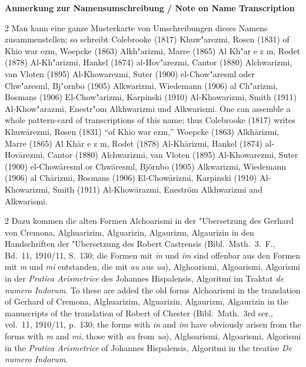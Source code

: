 \documentclass[10pt,a4paper]{article}
\renewcommand{\switchcolumn}{\syncronize\nointerlineskip\columnbreak}
\begin{document}
\vspace{0.8em}
\textbf{Anmerkung zur Namensumschreibung / Note on Name Transcription}

\begin{paracol}{2}
Man kann eine ganze Musterkarte von Umschreibungen dieses Namens zusammenstellen; so schreibt Colebrooke (1817) Khuw"arezmi, Rosen (1831) of Khio war ezm, Woepcke (1863) Alkh"arizmi, Marre (1865) Al Kh"ar e z m, Rodet (1878) Al-Kh"arizmi, Hankel (1874) al-Hov"arezmi, Cantor (1880) Alchwarizmi, van Vloten (1895) Al-Khowarezmi, Suter (1900) el-Chow"aresml oder Chw"aresml, Bj"ornbo (1905) Alkwarizmi, Wiedemann (1906) al Ch"arizmi, Bosmans (1906) El-Chow"arizmi, Karpinski (1910) Al-Khowarizmi, Smith (1911) Al-Khow"arazmi, Enestr"om Alkhwarizmi und Alkwarismi.
\switchcolumn
One can assemble a whole pattern-card of transcriptions of this name; thus Colebrooke (1817) writes Khuw\=arezmi, Rosen (1831) ``of Khio war ezm,'' Woepcke (1863) Alkh\=arizmi, Marre (1865) Al Kh\=ar e z m, Rodet (1878) Al-Kh\=arizmi, Hankel (1874) al-Hov\=arezmi, Cantor (1880) Alchwarizmi, van Vloten (1895) Al-Khowarezmi, Suter (1900) el-Chow\=aresml or Chw\=aresml, Bj\"ornbo (1905) Alkwarizmi, Wiedemann (1906) al Ch\=arizmi, Bosmans (1906) El-Chow\=arizmi, Karpinski (1910) Al-Khowarizmi, Smith (1911) Al-Khow\=arazmi, Enestr\"om Alkhwarizmi and Alkwarismi.
\end{paracol}

\begin{paracol}{2}
Dazu kommen die alten Formen Alchoarismi in der "Ubersetzung des Gerhard von Cremona, Alghuarizim, Alguarizin, Algaurizm, Algaurizin in den Handschriften der "Ubersetzung des Robert Castrensis (Bibl.\ Math.\ 3.\ F., Bd.\ 11, 1910/11, S.\ 130; die Formen mit \textit{in} und \textit{im} sind offenbar aus den Formen mit \textit{m} und \textit{mi} entstanden, die mit \textit{au} aus \textit{ua}), Alghoarismi, Algoarismi, Algorismi in der \textit{Pratica Arismetrice} des Johannes Hispalensis, Algoritmi im Traktat \textit{de numero Indorum}.
\switchcolumn
To these are added the old forms Alchoarismi in the translation of Gerhard of Cremona, Alghuarizim, Alguarizin, Algaurizm, Algaurizin in the manuscripts of the translation of Robert of Chester (Bibl.\ Math.\ 3rd ser., vol.\ 11, 1910/11, p.\ 130; the forms with \textit{in} and \textit{im} have obviously arisen from the forms with \textit{m} and \textit{mi}, those with \textit{au} from \textit{ua}), Alghoarismi, Algoarismi, Algorismi in the \textit{Pratica Arismetrice} of Johannes Hispalensis, Algoritmi in the treatise \textit{De numero Indorum}.
\end{paracol}
\end{document}
